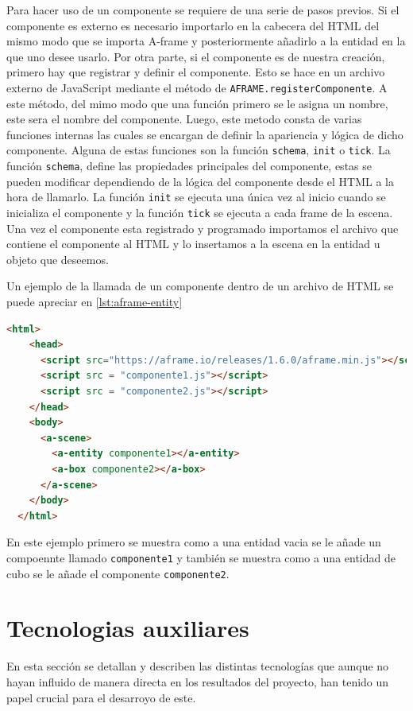 \documentclass[a4paper, 12pt]{book}
\begin{document}
Para hacer uso de un componente se requiere de una serie de pasos previos. Si el componente es externo es necesario importarlo en la cabecera del HTML del mismo modo que se importa A-frame y posteriormente añadirlo a la entidad en la que uno desee usarlo. 
Por otra parte, si el  componente es de nuestra creación, primero hay que registrar y definir el componente. Esto se hace en un archivo externo de JavaScript mediante el método de \texttt{AFRAME.registerComponente}. A este método, del mimo modo que una función primero se le asigna un nombre, 
este sera el nombre del componente. Luego, este metodo consta de varias funciones internas las cuales se encargan de definir la apariencia y lógica de dicho componente. Alguna de estas funciones son la función \texttt{schema}, \texttt{init} o \texttt{tick}.
La función \texttt{schema}, define las propiedades principales del componente, estas se pueden modificar dependiendo de la lógica del componente desde el HTML a la hora de llamarlo. La función \texttt{init} se ejecuta una única vez al inicio cuando se inicializa el componente y la función \texttt{tick} se ejecuta a cada frame de la escena.
Una vez el componente esta registrado y programado importamos el archivo que contiene el componente al HTML y lo insertamos a la escena en la entidad u objeto que deseemos. 

Un ejemplo de la llamada de un componente dentro de un archivo de HTML se puede apreciar en \ref{lst:aframe-entity}
\begin{lstlisting}[language=HTML, caption=Ejemplo de entidad en A-frame, captionpos=b, label=lst:aframe-entity]
  <html>
    <head>
      <script src="https://aframe.io/releases/1.6.0/aframe.min.js"></script>
      <script src = "componente1.js"></script>
      <script src = "componente2.js"></script>
    </head>
    <body>
      <a-scene>
        <a-entity componente1></a-entity>
        <a-box componente2></a-box>
      </a-scene>
    </body>
  </html>
\end{lstlisting}

En este ejemplo primero se muestra como a una entidad vacia se le añade un compoennte llamado \texttt{componente1} y también se muestra como a una entidad de cubo se le añade el componente \texttt{componente2}.

\section{Tecnologias auxiliares}
\label{sec:tecnologias-auxiliares}
En esta sección se detallan y describen las distintas tecnologías que aunque no hayan influido de manera directa en los resultados del proyecto, han tenido un papel crucial para el desarroyo de este.
\end{document}
